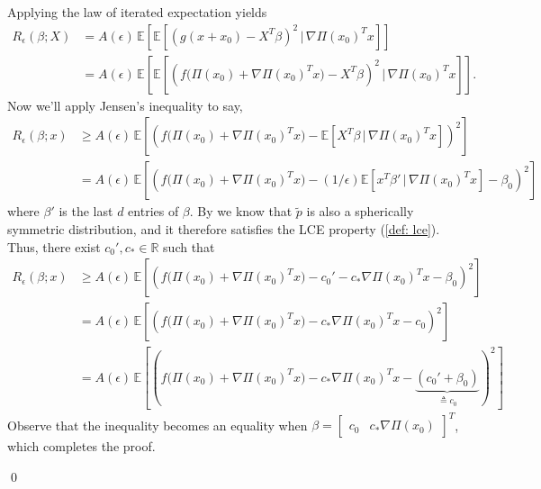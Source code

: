 \documentclass[11pt]{article}
\begin{document}
Applying the law of iterated expectation yields
\begin{align*}
    R_{\epsilon}(\beta; X)&= A(\epsilon)\,\mathbb{E}\left[\mathbb{E}\left[\left(g(x+x_0)-X^{T}\beta\right)^2 \, \Big| 
    \, \nabla\Pi(x_0)^{T}x\right]\right]\\
    &= A(\epsilon)\,\mathbb{E}\left[\mathbb{E}\left[\left(f\Big(\Pi(x_0) + \nabla\Pi(x_0)^{T}x\Big)-X^{T}\beta\right)^2 \, \Big| 
    \, \nabla\Pi(x_0)^{T}x\right]\right].
\end{align*}
Now we'll apply Jensen's inequality to say,
\begin{align*}
    R_{\epsilon}(\beta; x) &\geq A( \epsilon)\,\mathbb{E}\left[\left(f\Big(\Pi(x_0) + \nabla\Pi(x_0)^{T}x\Big)-\mathbb{E}\left[X^{T}\beta \, \Big| 
    \, \nabla\Pi(x_0)^{T}x\right]\right)^2\right] \\
    &= A( \epsilon)\,\mathbb{E}\left[\left(f\Big(\Pi(x_0) + \nabla\Pi(x_0)^{T}x\Big)-(1/\epsilon)\mathbb{E}\left[x^{T}\beta' \, \Big| 
    \, \nabla\Pi(x_0)^{T}x\right]- \beta_0\right)^2\right]
\end{align*}
where $\beta'$ is the last $d$ entries of $\beta$. By  we know that $\tilde{p}$ is also a spherically symmetric distribution, and it therefore satisfies the LCE property (\cref{def: lce}). Thus, there exist $c_0', c_* \in \mathbb{R}$ such that 
\begin{align}
    R_{\epsilon}(\beta; x) &\geq A( \epsilon)\,\mathbb{E}\left[\left(f\Big(\Pi(x_0) + \nabla\Pi(x_0)^{T}x\Big)-c_0' - c_*\nabla\Pi(x_0)^{T}x - \beta_0\right)^2\right] \\
    &=  A( \epsilon)\,\mathbb{E}\left[\left(f\Big(\Pi(x_0) + \nabla\Pi(x_0)^{T}x\Big) - c_*\nabla\Pi(x_0)^{T}x - c_0\right)^2\right] \\
    &= A( \epsilon)\,\mathbb{E}\left[\left(f\Big(\Pi(x_0) + \nabla\Pi(x_0)^{T}x\Big) - c_*\nabla\Pi(x_0)^{T}x - \underbrace{(c_0' + \beta_0)}_{\triangleq c_0}\right)^2\right]\label{eq: surrogate risk lower bound}
\end{align}
Observe that the inequality becomes an equality when $\beta = \begin{bmatrix}c_0  & c_*\nabla \Pi(x_0) \end{bmatrix}^T$, which completes the proof.

\qed{}
\end{document}
